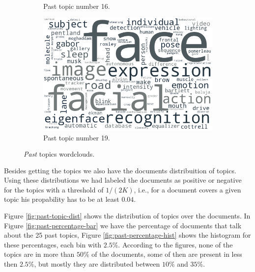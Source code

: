 \begin{figure}[h!]
\begin{subfigure}{0.49\textwidth}
		\caption{Past topic number 16.}
	\end{subfigure}%
	\hfill
	\begin{subfigure}{0.49\textwidth}
		\includegraphics[width=\linewidth]{01.Chapters/05.Results/past_19}
		\caption{Past topic number 19.}
	\end{subfigure}%
	\caption{\textit{Past} topics wordclouds.}
	\label{fig:past-wordcloud}
\end{figure}

Besides getting the topics we also have the documents distribuition of topics. Using these distributions we had labeled the documents as positive or negative for the topics with a threshold of $1 / (2 K)$, i.e., for a document covers a given topic his propability has to be at least $0.04$.

Figure \ref{fig:past-topic-dist} shows the distribution of topics over the documents. In Figure \ref{fig:past-percentage-bar} we have the percentage of documents that talk about the 25 past topics, Figure \ref{fig:past-percentage-hist} shows the histogram for these percentages, each bin with $2.5\%$. According to the figures, none of the topics are in more than $50\%$ of the documents, some of then are present in less then $2.5\%$, but mostly they are distributed between $10\%$ and $35\%$.

